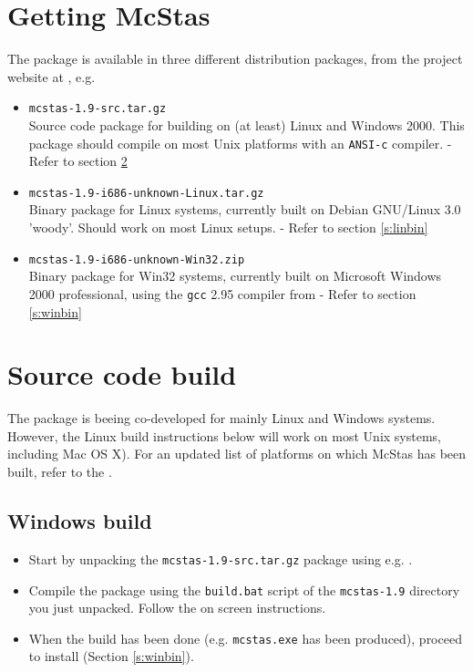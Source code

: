 \section{Getting McStas}
\label{s:obtain}
The  package is
available in three different distribution packages, from the project
website at
, e.g.
\begin{itemize}
\item{\texttt{mcstas-1.9-src.tar.gz}\\Source code package for
    building  on
    (at least) Linux and Windows 2000. This package should compile on
    most Unix platforms with an \texttt{ANSI-c} compiler. - Refer to section \ref{s:src}}
\item{\texttt{mcstas-1.9-i686-unknown-Linux.tar.gz}\\Binary package
  for Linux systems, currently built on Debian GNU/Linux 3.0 'woody'.
  Should work on most Linux setups.
 - Refer to section \ref{s:linbin}}
\item{\texttt{mcstas-1.9-i686-unknown-Win32.zip}\\Binary package
  for Win32 systems, currently built on Microsoft Windows 2000
  professional, using the \texttt{gcc} 2.95 compiler from
   - Refer to section \ref{s:winbin}}
\end{itemize}

\section{Source code build}
\label{s:src}
The  package is
beeing co-developed for mainly Linux and Windows systems. However,
the Linux build instructions below will work on most Unix
systems, including Mac OS X). For an updated list of platforms on which McStas has been
built, refer to the .

\subsection{Windows build}
\begin{itemize}
\item{Start by unpacking the \texttt{mcstas-1.9-src.tar.gz} package using
e.g. .}
\item{Compile the  package using the \texttt{build.bat} script of the
\texttt{mcstas-1.9} directory you just unpacked. Follow the on screen
instructions.}
\item{When the build has been done (e.g. \texttt{mcstas.exe}
has been produced), proceed to install (Section \ref{s:winbin}).}
\end{itemize}

